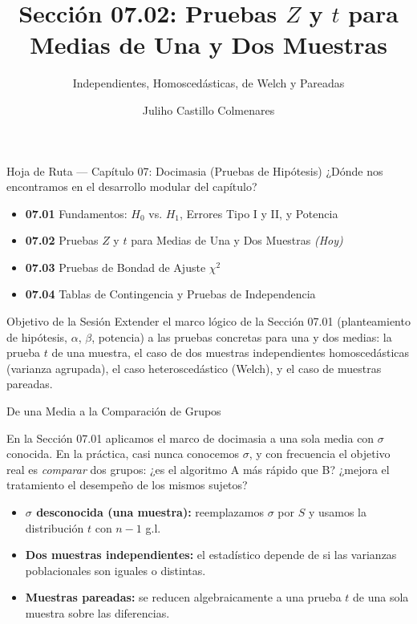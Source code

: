 \documentclass[10pt, aspectratio=169]{beamer}
\title[Pruebas $Z$/$t$ para Medias]{Sección 07.02: Pruebas $Z$ y $t$ para Medias de Una y Dos Muestras}
\subtitle{Independientes, Homoscedásticas, de Welch y Pareadas}
\author[J. Castillo Colmenares]{Juliho Castillo Colmenares}
\institute{Tecnológico de Monterrey}
\date{\vspace{-1.2cm}}
\begin{document}
\begin{frame}[plain]
  \vspace{-0.8cm}
  \titlepage
\end{frame}

\begin{frame}{Hoja de Ruta --- Capítulo 07: Docimasia (Pruebas de Hipótesis)}
  \footnotesize
  ¿Dónde nos encontramos en el desarrollo modular del capítulo? \pause
  \begin{itemize}\itemsep=0.08em
    \item \textbf{07.01} Fundamentos: $H_0$ vs. $H_1$, Errores Tipo I y II, y Potencia \pause
    \item \textbf{07.02} Pruebas $Z$ y $t$ para Medias de Una y Dos Muestras \emph{(Hoy)} \pause
    \item \textbf{07.03} Pruebas de Bondad de Ajuste $\chi^2$ \pause
    \item \textbf{07.04} Tablas de Contingencia y Pruebas de Independencia
  \end{itemize}
  \vspace{-0.05cm}
  \begin{block}{Objetivo de la Sesión}
    Extender el marco lógico de la Sección 07.01 (planteamiento de hipótesis, $\alpha$, $\beta$, potencia) a las pruebas concretas para una y dos medias: la prueba $t$ de una muestra, el caso de dos muestras independientes homoscedásticas (varianza agrupada), el caso heteroscedástico (Welch), y el caso de muestras pareadas.
  \end{block}
\end{frame}

\begin{frame}{De una Media a la Comparación de Grupos}
  \footnotesize
  \begin{motivacion}
    En la Sección 07.01 aplicamos el marco de docimasia a una sola media con $\sigma$ conocida. En la práctica, casi nunca conocemos $\sigma$, y con frecuencia el objetivo real es \emph{comparar} dos grupos: ¿es el algoritmo A más rápido que B? ¿mejora el tratamiento el desempeño de los mismos sujetos?
  \end{motivacion}

  \vspace{0.15cm}
  \pause
  \begin{itemize}\itemsep=0.1cm
    \item \textbf{$\sigma$ desconocida (una muestra):} reemplazamos $\sigma$ por $S$ y usamos la distribución $t$ con $n-1$ g.l. \pause
    \item \textbf{Dos muestras independientes:} el estadístico depende de si las varianzas poblacionales son iguales o distintas. \pause
    \item \textbf{Muestras pareadas:} se reducen algebraicamente a una prueba $t$ de una sola muestra sobre las diferencias.
  \end{itemize}
\end{frame}
\end{document}
